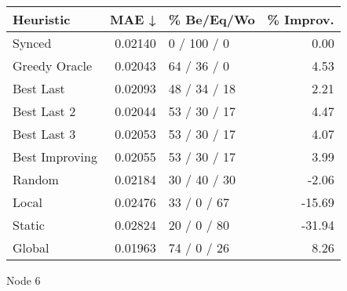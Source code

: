 \begin{tabular}{lrlr}
\toprule
\textbf{Heuristic} & \textbf{MAE ↓} & \textbf{\% Be/Eq/Wo} & \textbf{\% Improv.} \\
\midrule
            Synced &        0.02140 &          0 / 100 / 0 &                0.00 \\
     Greedy Oracle &        0.02043 &          64 / 36 / 0 &                4.53 \\
         Best Last &        0.02093 &         48 / 34 / 18 &                2.21 \\
       Best Last 2 &        0.02044 &         53 / 30 / 17 &                4.47 \\
       Best Last 3 &        0.02053 &         53 / 30 / 17 &                4.07 \\
    Best Improving &        0.02055 &         53 / 30 / 17 &                3.99 \\
            Random &        0.02184 &         30 / 40 / 30 &               -2.06 \\
             Local &        0.02476 &          33 / 0 / 67 &              -15.69 \\
            Static &        0.02824 &          20 / 0 / 80 &              -31.94 \\
            Global &        0.01963 &          74 / 0 / 26 &                8.26 \\
\bottomrule
\end{tabular}
\caption{Node 6}
\label{tab:iid_lr05_le2_bs2_6}
